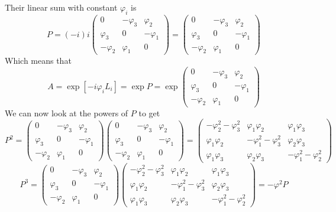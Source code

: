 \documentclass{article}
\begin{document}
Their linear sum with constant $\varphi_i$ is
\begin{equation}
    P = (-i) i \begin{pmatrix}
        0 & -\varphi_3 & \varphi_2 \\
        \varphi_3 & 0 & -\varphi_1 \\
        -\varphi_2 & \varphi_1 & 0
    \end{pmatrix} = \begin{pmatrix}
        0 & -\varphi_3 & \varphi_2 \\
        \varphi_3 & 0 & -\varphi_1 \\
        -\varphi_2 & \varphi_1 & 0
    \end{pmatrix}
\end{equation}
Which means that
\begin{equation}
    A = \exp\left[-i\varphi_i L_i\right] = \exp P = \exp \begin{pmatrix}
        0 & -\varphi_3 & \varphi_2 \\
        \varphi_3 & 0 & -\varphi_1 \\
        -\varphi_2 & \varphi_1 & 0
    \end{pmatrix}
\end{equation}
We can now look at the powers of $P$ to get
\begin{equation}
    P^2 = \begin{pmatrix}
        0 & -\varphi_3 & \varphi_2 \\
        \varphi_3 & 0 & -\varphi_1 \\
        -\varphi_2 & \varphi_1 & 0
    \end{pmatrix}\begin{pmatrix}
        0 & -\varphi_3 & \varphi_2 \\
        \varphi_3 & 0 & -\varphi_1 \\
        -\varphi_2 & \varphi_1 & 0
    \end{pmatrix}
    = \begin{pmatrix}
        -\varphi_2^2 - \varphi_3^2 & \varphi_1\varphi_2 & \varphi_1\varphi_3 \\ \varphi_1\varphi_2 & -\varphi_1^2 - \varphi_3^2 & \varphi_2\varphi_3 \\ \varphi_1\varphi_3 & \varphi_2\varphi_3 & -\varphi_1^2 - \varphi_2^2
    \end{pmatrix}
\end{equation}
\begin{equation}
    P^3 = \begin{pmatrix}
        0 & -\varphi_3 & \varphi_2 \\
        \varphi_3 & 0 & -\varphi_1 \\
        -\varphi_2 & \varphi_1 & 0
    \end{pmatrix} \begin{pmatrix}
        -\varphi_2^2 - \varphi_3^2 & \varphi_1\varphi_2 & \varphi_1\varphi_3 \\ \varphi_1\varphi_2 & -\varphi_1^2 - \varphi_3^2 & \varphi_2\varphi_3 \\ \varphi_1\varphi_3 & \varphi_2\varphi_3 & -\varphi_1^2 - \varphi_2^2
    \end{pmatrix} = -\varphi^2 P
\end{equation}
\end{document}
